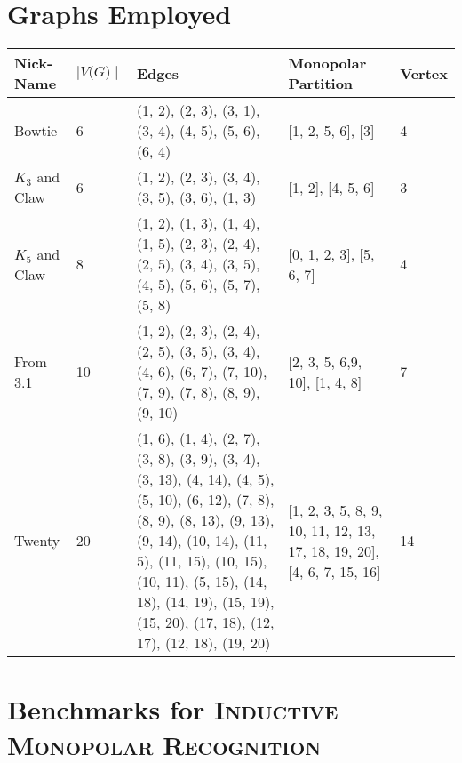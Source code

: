 \documentclass[11pt]{article}
\begin{document}

\section{Graphs Employed}
\label{subsec:graphs}

\begin{center}
\begin{tabu} to 0.8\textwidth { | X[l] X[c] X[c] X[c] X[c] | }
\hline
Nick-Name & $\mid\textit{V(G)}\mid$ & Edges & Monopolar Partition & Vertex \\
[0.5ex]
\hline
\hline
Bowtie & 6 & (1, 2), (2, 3), (3, 1), (3, 4), (4, 5), (5, 6), (6, 4) & [1, 2, 5, 6], [3] & 4 \\
[0.3ex]
\hline
$K_3$ and Claw & 6 & (1, 2), (2, 3), (3, 4), (3, 5), (3, 6), (1, 3) & [1, 2], [4, 5, 6] & 3 \\
[0.3ex]
\hline
$K_5$ and Claw & 8 & (1, 2), (1, 3), (1, 4), (1, 5), (2, 3), (2, 4), (2, 5), (3, 4), (3, 5), (4, 5), (5, 6), (5, 7), (5, 8) & [0, 1, 2, 3], [5, 6, 7] & 4 \\
[0.3ex]
\hline
From 3.1 & 10 & (1, 2), (2, 3), (2, 4), (2, 5), (3, 5), (3, 4), (4, 6), (6, 7), (7, 10), (7, 9), (7, 8), (8, 9), (9, 10) & [2, 3, 5, 6,9, 10], [1, 4, 8] & 7 \\
[0.3ex]
\hline
Twenty & 20 & (1, 6), (1, 4), (2, 7), (3, 8), (3, 9), (3, 4), (3, 13), (4, 14), (4, 5), (5, 10), (6, 12), (7, 8), (8, 9), (8, 13), (9, 13), (9, 14), (10, 14), (11, 5), (11, 15), (10, 15), (10, 11), (5, 15), (14, 18), (14, 19), (15, 19), (15, 20), (17, 18), (12, 17), (12, 18), (19, 20) & [1, 2, 3, 5, 8, 9, 10, 11, 12, 13, 17, 18, 19, 20], [4, 6, 7, 15, 16] & 14 \\
[0.3ex]
\hline
\end{tabu}
\end{center}

\section{Benchmarks for \textsc{Inductive Monopolar Recognition}}
\label{subsec:structural}
\end{document}
